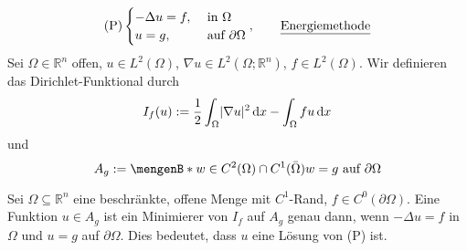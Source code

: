 \[
	\text{(P)} \begin{cases}
		- \Delta u = f, &\text{ in }\Omega\\
		u = g , & \text{ auf } \partial \Omega
	\end{cases}, \qquad \text{\underline{Energiemethode}}
\]
Sei $\Omega \in \mathbb{R}^n$ offen, $u \in L^2(\Omega)$, $ \nabla u \in L^2(\Omega; \mathbb{R}^n)$, $f \in L^2(\Omega)$. Wir definieren das Dirichlet-Funktional durch
\[
	I_f(u):= \frac{1}{2} \int_{\Omega}^{} \lvert \nabla u\rvert^2 \,\mathrm{d}x - \int_{\Omega}^{} f u \,\mathrm{d}x
\]
und 
\[
	A_g := \set[ w \in C^2(\Omega) \cap C^1(\bar{\Omega})]{w=g \text{ auf } \partial \Omega}
\]
\begin{satz}
	Sei $\Omega \subseteq \mathbb{R}^n$ eine beschränkte, offene Menge mit $C^1$-Rand, $f \in C^0(\partial \Omega)$. 
	Eine Funktion $u \in A_g$ ist ein Minimierer von $I_f$ auf $A_g$ genau dann, wenn $ - \Delta u = f$ in $\Omega$ und $u =g$ auf $\partial \Omega$.
	Dies bedeutet, dass $u$ eine Lösung von (P) ist.
\end{satz}

